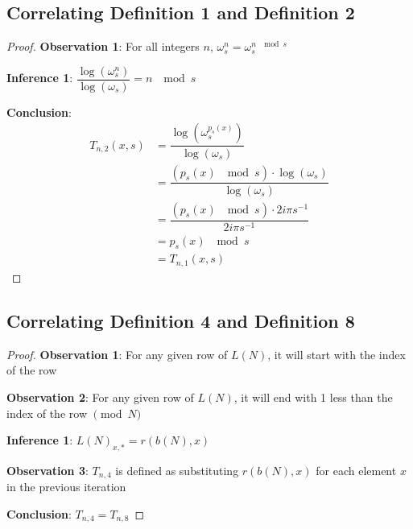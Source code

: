 \documentclass[conference]{IEEEtran}
\begin{document}
\subsection{Correlating Definition 1 and Definition 2}

\begin{proof}
\par\noindent\par
    \textbf{Observation 1}: For all integers $n$, $\omega_s^n = \omega_s^{n \; \mod{s}}$

    \textbf{Inference 1}: $\dfrac{\log(\omega_s^n)}{\log(\omega_s)} = n \; \mod{s}$

    \textbf{Conclusion}: \begin{equation}
        \begin{aligned}
            T_{n,2}(x, s) &= \dfrac{\log(\omega_s^{p_s(x)})}{\log(\omega_s)} \\
                          &= \dfrac{(p_s(x) \; \mod{s}) \cdot \log(\omega_s)}{\log(\omega_s)} \\
                          &= \dfrac{(p_s(x) \; \mod{s}) \cdot 2i\pi s^{-1}}{2i\pi s^{-1}} \\
                          &= p_s(x) \; \mod{s} \\
                          &= T_{n,1}(x, s)
        \end{aligned}
    \end{equation}
\end{proof}

\subsection{Correlating Definition 4 and Definition 8}

\begin{proof}
\par\noindent\par
    \textbf{Observation 1}: For any given row of $L(N)$, it will start with the index of the row

    \textbf{Observation 2}: For any given row of $L(N)$, it will end with 1 less than the index of the row $\pmod{N}$

    \textbf{Inference 1}: $L(N)_{x,*} = r(b(N), x)$

    \textbf{Observation 3}: $T_{n,4}$ is defined as substituting $r(b(N),x)$ for each element $x$ in the previous iteration

    \textbf{Conclusion}: $T_{n,4} = T_{n,8}$
\end{proof}
\end{document}
